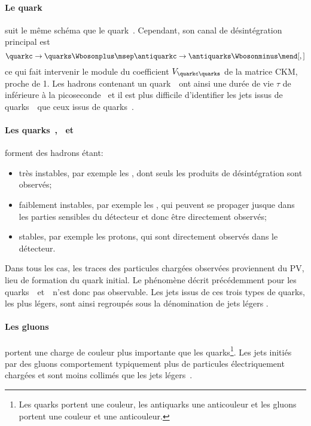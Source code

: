 \paragraph{Le quark~\quarkc} suit le même schéma que le quark~\quarkb. Cependant, son canal de désintégration principal est
\begin{equation}
\quarkc \to \quarks\Wbosonplus
\msep
\antiquarkc \to \antiquarks\Wbosonminus
\mend[,]
\end{equation}
ce qui fait intervenir le module du coefficient $V_{\quarkc\quarks}$ de la matrice CKM, proche de 1.
Les hadrons contenant un quark~\quarkc\ ont ainsi une durée de vie $\tau$ de inférieure à la picoseconde~\cite{lifetimes_c_b_hadrons} et il est plus difficile d'identifier les jets issus de quarks~\quarkc\ que ceux issus de quarks~\quarkb.
\paragraph{Les quarks~\quarkd, \quarku\ et~\quarks} forment des hadrons étant:
\begin{itemize}
\item très instables, par exemple les \pionnull, dont seuls les produits de désintégration sont observés;
\item faiblement instables, par exemple les \Kaonplus, qui peuvent se propager jusque dans les parties sensibles du détecteur et donc être directement observés;
\item stables, par exemple les protons, qui sont directement observés dans le détecteur.
\end{itemize}
Dans tous les cas, les traces des particules chargées observées proviennent du PV, lieu de formation du quark initial.
Le phénomène décrit précédemment pour les quarks~\quarkb\ et~\quarkc\ n'est donc pas observable.
Les jets issus de ces trois types de quarks, les plus légers, sont ainsi regroupés sous la dénomination de \og jets légers \fg.
\paragraph{Les gluons} portent une charge de couleur plus importante que les quarks\footnote{Les quarks portent une couleur, les antiquarks une anticouleur et les gluons portent une couleur et une anticouleur.}.
Les jets initiés par des gluons comportement typiquement plus de particules électriquement chargées et sont moins collimés que les jets légers~\cite{CMS-PAS-JME-13-002}.
